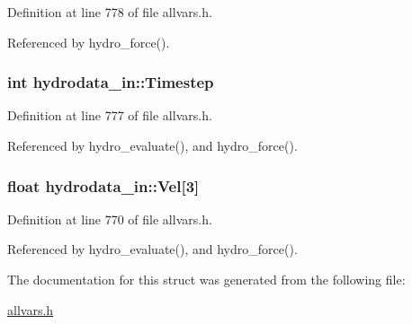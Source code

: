 Definition at line 778 of file allvars.h.



Referenced by hydro\_\-force().

\hypertarget{structhydrodata__in_a6b2160624adc7ad0304597845531ffa7}{
\subsubsection[{Timestep}]{\setlength{\rightskip}{0pt plus 5cm}int {\bf hydrodata\_\-in::Timestep}}}
\label{structhydrodata__in_a6b2160624adc7ad0304597845531ffa7}


Definition at line 777 of file allvars.h.



Referenced by hydro\_\-evaluate(), and hydro\_\-force().

\hypertarget{structhydrodata__in_aac935e4620b7700cae000a32a2922df4}{
\subsubsection[{Vel}]{\setlength{\rightskip}{0pt plus 5cm}float {\bf hydrodata\_\-in::Vel}\mbox{[}3\mbox{]}}}
\label{structhydrodata__in_aac935e4620b7700cae000a32a2922df4}


Definition at line 770 of file allvars.h.



Referenced by hydro\_\-evaluate(), and hydro\_\-force().



The documentation for this struct was generated from the following file:\begin{DoxyCompactItemize}
\item 
\hyperlink{allvars_8h}{allvars.h}\end{DoxyCompactItemize}
